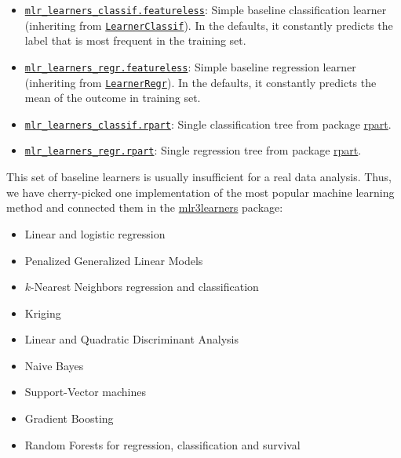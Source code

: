 \documentclass[
]{scrbook}
\providecommand{\tightlist}{%
  \setlength{\itemsep}{0pt}\setlength{\parskip}{0pt}}
\begin{document}
\begin{itemize}
\tightlist
\item
  \href{https://mlr3.mlr-org.com/reference/mlr_learners_classif.featureless.html}{\texttt{mlr\_learners\_classif.featureless}}: Simple baseline classification learner (inheriting from \href{https://mlr3.mlr-org.com/reference/LearnerClassif.html}{\texttt{LearnerClassif}}).
  In the defaults, it constantly predicts the label that is most frequent in the training set.
\item
  \href{https://mlr3.mlr-org.com/reference/mlr_learners_regr.featureless.html}{\texttt{mlr\_learners\_regr.featureless}}: Simple baseline regression learner (inheriting from \href{https://mlr3.mlr-org.com/reference/LearnerRegr.html}{\texttt{LearnerRegr}}).
  In the defaults, it constantly predicts the mean of the outcome in training set.
\item
  \href{https://mlr3.mlr-org.com/reference/mlr_learners_classif.rpart.html}{\texttt{mlr\_learners\_classif.rpart}}: Single classification tree from package \href{https://cran.r-project.org/package=rpart}{rpart}.
\item
  \href{https://mlr3.mlr-org.com/reference/mlr_learners_regr.rpart.html}{\texttt{mlr\_learners\_regr.rpart}}: Single regression tree from package \href{https://cran.r-project.org/package=rpart}{rpart}.
\end{itemize}

This set of baseline learners is usually insufficient for a real data analysis.
Thus, we have cherry-picked one implementation of the most popular machine learning method and connected them in the \href{https://mlr3learners.mlr-org.com}{mlr3learners} package:

\begin{itemize}
\tightlist
\item
  Linear and logistic regression
\item
  Penalized Generalized Linear Models
\item
  \(k\)-Nearest Neighbors regression and classification
\item
  Kriging
\item
  Linear and Quadratic Discriminant Analysis
\item
  Naive Bayes
\item
  Support-Vector machines
\item
  Gradient Boosting
\item
  Random Forests for regression, classification and survival
\end{itemize}
\end{document}
